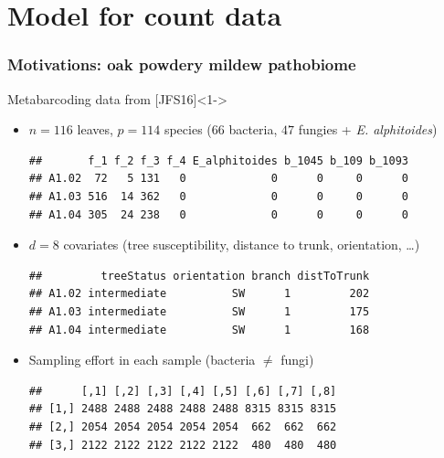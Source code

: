 \documentclass[10pt, c, xcolor=x11names]{beamer}\usepackage[]{graphicx}\usepackage[]{color}
\makeatletter
\newenvironment{kframe}{%
 \def\at@end@of@kframe{}%
 \ifinner\ifhmode%
  \def\at@end@of@kframe{\end{minipage}}%
  \begin{minipage}{\columnwidth}%
 \fi\fi%
 \def\FrameCommand##1{\hskip\@totalleftmargin \hskip-\fboxsep
 \colorbox{shadecolor}{##1}\hskip-\fboxsep
     \hskip-\linewidth \hskip-\@totalleftmargin \hskip\columnwidth}%
 \MakeFramed {\advance\hsize-\width
   \@totalleftmargin\z@ \linewidth\hsize
   \@setminipage}}%
 {\par\unskip\endMakeFramed%
 \at@end@of@kframe}
\newenvironment{knitrout}{}{} %
\makeatother
\begin{document}







\section{Model for count data}

\begin{frame}[fragile]
  \frametitle{Motivations: oak powdery mildew pathobiome}

  \begin{block}{Metabarcoding data from [JFS16]}<1->
    \begin{itemize}
    \item $n = 116$ leaves, $p = 114$ species ($66$ bacteria, $47$ fungies + \textit{E. alphitoides})
\begin{knitrout}\scriptsize
{}\color{fgcolor}\begin{kframe}
\begin{verbatim}
##       f_1 f_2 f_3 f_4 E_alphitoides b_1045 b_109 b_1093
## A1.02  72   5 131   0             0      0     0      0
## A1.03 516  14 362   0             0      0     0      0
## A1.04 305  24 238   0             0      0     0      0
\end{verbatim}
\end{kframe}
\end{knitrout}
    \item $d = 8$ covariates (tree susceptibility, distance to trunk, orientation, \dots)
\begin{knitrout}\scriptsize
{}\color{fgcolor}\begin{kframe}
\begin{verbatim}
##         treeStatus orientation branch distToTrunk
## A1.02 intermediate          SW      1         202
## A1.03 intermediate          SW      1         175
## A1.04 intermediate          SW      1         168
\end{verbatim}
\end{kframe}
\end{knitrout}
    \item Sampling effort in each sample (bacteria $\neq$  fungi)
\begin{knitrout}\scriptsize
{}\color{fgcolor}\begin{kframe}
\begin{verbatim}
##      [,1] [,2] [,3] [,4] [,5] [,6] [,7] [,8]
## [1,] 2488 2488 2488 2488 2488 8315 8315 8315
## [2,] 2054 2054 2054 2054 2054  662  662  662
## [3,] 2122 2122 2122 2122 2122  480  480  480
\end{verbatim}
\end{kframe}
\end{knitrout}
    \end{itemize}
  \end{block}


\end{frame}
\end{document}
